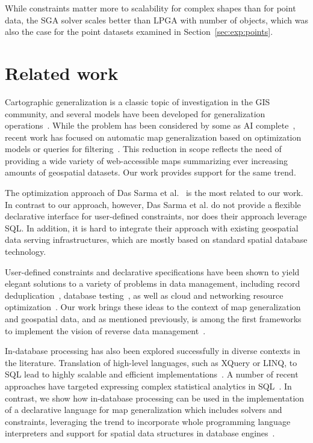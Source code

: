 \documentclass[11pt, oneside]{report}
\begin{document}
{While constraints matter more to scalability for complex shapes than for point data, the SGA solver scales better than LPGA with number of objects, which was also the case for the point datasets examined in Section~\ref{sec:exp:points}.

\section{Related work}
\label{sec:cvl:related:work}

Cartographic generalization is a classic topic of investigation in the GIS community, and several models have been developed for generalization operations~\cite{harrie2007modelling}. While the problem has been considered by some as AI complete~\cite{frank1994multiscaletree}, recent work has focused on automatic map generalization based on optimization models or queries for filtering~\cite{sarma2012fusiontables,nutanong2012multiresolution}. This reduction in scope reflects the need of providing a wide variety of web-accessible maps summarizing ever increasing amounts of geospatial datasets. Our work provides support for the same trend.  

The optimization approach of Das Sarma et al.~\cite{sarma2012fusiontables} is the most related to our work. In contrast to our approach, however, Das Sarma et al. do not provide a flexible declarative interface for user-defined constraints, nor does their approach leverage SQL. 
In addition, it is hard to integrate their approach with existing geospatial data serving infrastructures, which are mostly based on standard spatial database technology.

User-defined constraints and declarative specifications have been shown to yield elegant solutions to a variety of problems in data management, including record deduplication~\cite{ArasuRS09:Dedupalog}, database testing~\cite{BinnigKL07:ReverseQP,Binnig:2007:SymbolicQP}, as well as cloud and networking resource optimization~\cite{Liu:2012:Cologne}. Our work brings these ideas to the context of map generalization and geospatial data, and as mentioned previously, is among the first frameworks to implement the vision of reverse data management~\cite{meliou2011reverse}. 

In-database processing has also been explored successfully in diverse contexts in the literature. Translation of high-level languages, such as XQuery or LINQ, to SQL lead to highly scalable and efficient implementations~\cite{pathfinder,ferry}. A number of recent approaches have targeted expressing complex statistical analytics in SQL~\cite{Hellerstein:2012:Madlib,Ordonez2007:StatisticsUDFs}. In contrast, we show how in-database processing can be used in the implementation of a declarative language for map generalization which includes solvers and constraints, leveraging the trend to incorporate whole programming language interpreters and support for spatial data structures in database engines~\cite{Blakeley2008:DotNET}.  

}
\end{document}
